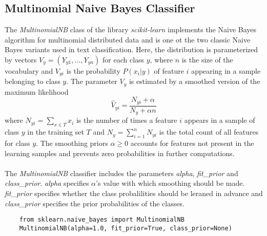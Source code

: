 \documentclass[a4paper, 11pt,titlepage,oneside,openany]{book}
\begin{document}
\subsection{Multinomial Naive Bayes Classifier}
The \textit{MultinomialNB} class of the library \textit{scikit-learn} implements the Naive Bayes algorithm for multinomial distributed data and is one ot the two classic Naive Bayes variants  used in text classification. Here, the distribution is parameterized by vectors $V_y=(Y_{y1},...,Y_{yn})$ for each class $y$, where $n$ is the size of the vocabulary and $V_{yi}$ is the probability $P(x_i|y)$ of feature $i$ appearing in a sample belonging to class $y$. The parameter $V_y$ is estimated by a smoothed version of the maximum likelihood
\[
	\hat{V}_{yi}=\frac{N_{yi}+\alpha}{N_y + \alpha n}
\]
where $N_{yi}=\sum_{x \in T}x_i$ is the number of times a feature $i$ appears in a sample of class $y$ in the training set $T$ and $N_y=\sum_{i=1}^{n}N_{yi}$ is the total count of all features for class $y$. The smoothing priors $\alpha \ge 0$ accounts for features not present in the learning samples and prevents zero probabilities in further computations. \\
\\ The \textit{MultinomialNB} classifier includes the parameters \textit{alpha}, \textit{fit\_prior} and \textit{class\_prior}. \textit{alpha} specifies $\alpha$'s value with which smoothing should be made. \textit{fit\_prior} specifies  whether the class probalilities should be leraned in advance and \textit{class\_prior} specifies the prior probabilities of the classes.\\
\noindent
\begin{minipage}{\linewidth}
	\begin{lstlisting}
	from sklearn.naive_bayes import MultinomialNB
	MultinomialNB(alpha=1.0, fit_prior=True, class_prior=None)
	\end{lstlisting}
\end{minipage} \\
\end{document}

